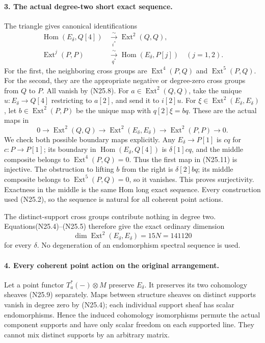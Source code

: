 \paragraph{3. The actual degree-two short exact sequence.}
The triangle gives canonical identifications
\[
 \begin{aligned}
 \operatorname{Hom}(E_\delta,Q[4])
        &\xrightarrow[\ i^*\ ]{\sim}\operatorname{Ext}^2(Q,Q),\\
 \operatorname{Ext}^j(P,P)
        &\xrightarrow[\ q^*\ ]{\sim}\operatorname{Hom}(E_\delta,P[j])
                         \quad(j=1,2).
 \end{aligned}                                               \tag{N25.10}
\]
For the first, the neighboring cross groups are
$\operatorname{Ext}^4(P,Q)$ and $\operatorname{Ext}^5(P,Q)$.
For the second, they are the appropriate negative or degree-zero
cross groups from $Q$ to $P$. All vanish by (N25.8).
For $a\in\operatorname{Ext}^2(Q,Q)$, take the unique
$u:E_\delta\to Q[4]$ restricting to $a[2]$, and send it to
$i[2]u$. For $\xi\in\operatorname{Ext}^2(E_\delta,E_\delta)$,
let $b\in\operatorname{Ext}^2(P,P)$ be the unique map with
$q[2]\xi=bq$. These are the actual maps in
\[
 0\longrightarrow\operatorname{Ext}^2(Q,Q)
 \longrightarrow\operatorname{Ext}^2(E_\delta,E_\delta)
 \longrightarrow\operatorname{Ext}^2(P,P)\longrightarrow0.
                                                               \tag{N25.11}
\]
We check both possible boundary maps explicitly. Any
$E_\delta\to P[1]$ is $cq$ for $c:P\to P[1]$;
its boundary in $\operatorname{Hom}(E_\delta,Q[4])$ is
$\delta[1]cq$, and the middle composite belongs to
$\operatorname{Ext}^4(P,Q)=0$. Thus the first map in
(N25.11) is injective. The obstruction to lifting $b$ from
the right is $\delta[2]bq$; its middle composite belongs to
$\operatorname{Ext}^5(P,Q)=0$, so it vanishes. This proves
surjectivity. Exactness in the middle is the same Hom long
exact sequence. Every construction used (N25.2), so the
sequence is natural for all coherent point actions.

The distinct-support cross groups contribute nothing in
degree two. Equations(N25.4)--(N25.5) therefore give the exact
ordinary dimension
\[
                  \dim\operatorname{Ext}^2(E_\delta,E_\delta)
                                  =15N=141120              \tag{N25.12}
\]
for every $\delta$. No degeneration of an endomorphism
spectral sequence is used.

\paragraph{4. Every coherent point action on the original arrangement.}
Let a point functor $T_a^*(-)\otimes M$ preserve $E_\delta$.
It preserves its two cohomology sheaves (N25.9) separately.
Maps between structure sheaves on distinct supports vanish
in degree zero by (N25.4); each individual support sheaf has
scalar endomorphisms. Hence the induced cohomology isomorphisms
permute the actual component supports and have only scalar
freedom on each supported line. They cannot mix distinct
supports by an arbitrary matrix.

